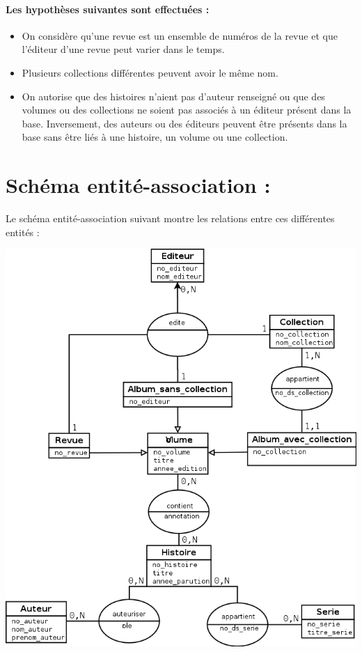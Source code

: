 \documentclass[12pt]{article}
\begin{document}
\paragraph{Les hypothèses suivantes sont effectuées :}
\begin{itemize}
	\item On considère qu'une revue est un ensemble de numéros de la revue et que l'éditeur d'une revue peut varier dans le temps.
	\item Plusieurs collections différentes peuvent avoir le même nom.
	\item On autorise que des histoires n'aient pas d'auteur renseigné ou que
		des volumes ou des collections ne soient pas associés à un éditeur
		présent dans la base. Inversement, des auteurs ou des éditeurs peuvent
		être présents dans la base sans être liés à une histoire, un volume ou
		une collection.
\end{itemize}


\section{Schéma entité-association :}

Le schéma entité-association suivant montre les relations entre ces
différentes entités :

\noindent\includegraphics[width=\textwidth]{schema-entite-association}
\end{document}
